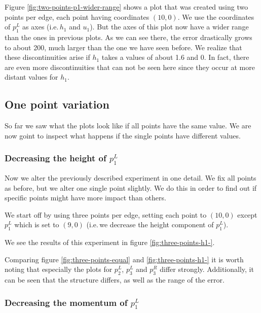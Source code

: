 \documentclass{article}
\begin{document}
Figure \ref{fig:two-points-p1-wider-range} shows a plot that was created using two points per edge, each point having coordinates $(10,0)$. We use the coordinates of $p_1^L$ as axes (i.e.\,$h_1$ and $u_1$). But the axes of this plot now have a wider range than the ones in previous plots. As we can see there, the error drastically grows to about 200, much larger than the one we have seen before. We realize that these discontinuities arise if $h_1$ takes a values of about 1.6 and 0. In fact, there are even more discontinuities that can not be seen here since they occur at more distant values for $h_1$.

\subsection{One point variation}
\label{sec:one-point-variation}

So far we saw what the plots look like if all points have the same value. We are now goint to inspect what happens if the single points have different values.

\subsubsection{\texorpdfstring{Decreasing the height of $p_1^L$}{Decreasing the height of p1L}}
\label{sec:decreasing-height-p1}

Now we alter the previously described experiment in one detail. We fix all points as before, but we alter one single point slightly. We do this in order to find out if specific points might have more impact than others.

We start off by using three points per edge, setting each point to $\left(10, 0\right)$ except $p_1^L$ which is set to $\left(9, 0\right)$ (i.e.\,we decrease the height component of $p_1^L$).



We see the results of this experiment in figure \ref{fig:three-points-h1-}.

Comparing figure \ref{fig:three-points-equal} and \ref{fig:three-points-h1-} it is worth noting that especially the plots for $p_2^L$, $p_3^L$ and $p_3^R$ differ strongly. Additionally, it can be seen that the structure differs, as well as the range of the error.

\subsubsection{\texorpdfstring{Decreasing the momentum of $p_1^L$}{Decreasing the momentum of p1L}}
\label{sec:decreasing-momentum-p1}
\end{document}
